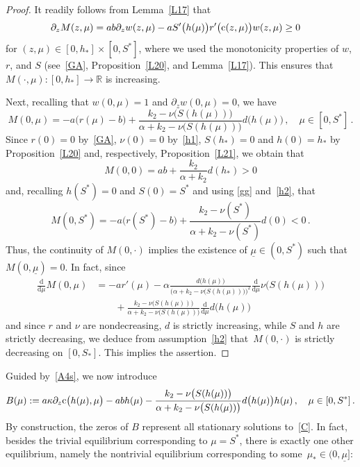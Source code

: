 \documentclass[reqno,11pt]{amsart}
\numberwithin{equation}{section}
\newcommand{\R}{\mathbb{R}}
\newcommand{\rd}{\mathrm{d}}
\begin{document}
\begin{proof}
It readily follows from Lemma~\ref{L17}  that
\begin{align*}
\partial_z M(z,\mu)&=ab\partial_z w(z,\mu)-aS'\big(h(\mu)\big)r'\big({\rm c}(z,\mu)\big)w(z,\mu)\ge 0
\end{align*}
for $(z,\mu)\in [0,h_*]\times [0,S^*]$, where we used the monotonicity properties of $w$, $r$, and $S$ (see~\eqref{GA}, Proposition~\ref{L20}, and Lemma~\ref{L17}). This ensures that \mbox{$M(\cdot,\mu):[0,h_*]\to \R$} is increasing.

Next, recalling that $w(0,\mu)=1$ and $\partial_zw(0,\mu)=0$, we have
$$
M(0,\mu)=-a\big(r(\mu)-b\big)+\frac{k_2-\nu\big(S(h(\mu))\big)}{\alpha+k_2-\nu\big(S(h(\mu))\big)}d\big(h(\mu)\big)\,,\quad \mu\in [0,S^*]\,.
$$
Since $r(0)=0$ by~\eqref{GA}, $\nu(0)=0$ by~\eqref{h1}, $S(h_*)=0$ and $h(0)=h_*$ by Proposition~\ref{L20} and, respectively, Proposition~\ref{L21}, we obtain that
$$
M(0,0)=ab+\frac{k_2}{\alpha+k_2}d(h_*)>0
$$
and, recalling $h(S^*)=0$ and $S(0)=S^*$ and using \eqref{gg} and~\eqref{h2}, that
$$
M(0,S^*)=-a\big(r(S^*)-b\big)+\frac{k_2-\nu(S^*)}{\alpha+k_2-\nu(S^*)}d(0)<0\,.
$$
Thus, the continuity of $M(0,\cdot)$ implies the existence of $\underline{\mu}\in (0,S^*)$ such that $M(0,\underline{\mu})=0$. In fact, since
\begin{align*}
\frac{\rd}{\rd \mu}M(0,\mu)&=-a r'(\mu)-\alpha\frac{d\big(h(\mu)\big)}{\big(\alpha+k_2-\nu\big(S(h(\mu))\big)\big)^2} \frac{\rd}{\rd \mu}\nu\big(S(h(\mu))\big)\\
&\qquad+\frac{k_2-\nu\big(S(h(\mu))\big)}{\alpha+k_2-\nu\big(S(h(\mu))\big)}\frac{\rd}{\rd \mu}d\big(h(\mu)\big)
\end{align*}
and since $r$ and $\nu$ are  nondecreasing, $d$ is strictly increasing, while $S$ and $h$ are strictly decreasing, we deduce from assumption~\eqref{h2} that~$M(0,\cdot)$ is strictly decreasing on $[0,S_*]$. This implies the assertion.
\end{proof}

Guided by~\eqref{A4s}, we now introduce
$$
B(\mu):=a\kappa \partial_z {\rm c}\big(h(\mu),\mu\big)-abh(\mu)-\frac{k_2-\nu\big(S(h(\mu))\big)}{\alpha+k_2-\nu\big(S(h(\mu))\big)}d\big(h(\mu)\big)h(\mu)\,,\quad \mu\in [0,S^*]\,.
$$
By construction, the zeros of $B$ represent  all stationary solutions to~\eqref{C}. In fact, besides the trivial equilibrium corresponding to $\mu=S^*$, there is exactly one other equilibrium, namely the nontrivial equilibrium corresponding to some~$\mu_*\in (0,\underline{\mu}]$:
\end{document}

